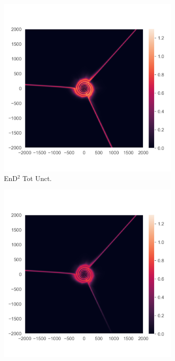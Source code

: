 \begin{figure}
\begin{subfigure}{0.22\textwidth}
  \centering
  \includegraphics[trim=42 45 15 55, clip, width=\linewidth]{plots/3d.png}
  \caption{EnD$^2$ Tot Unct.}
  \label{fig:3d}
\end{subfigure}%
\begin{subfigure}{0.22\textwidth}
  \centering
  \includegraphics[trim=42 45 15 55, clip, width=\linewidth]{plots/3e.png}

\end{subfigure}
\end{figure}
